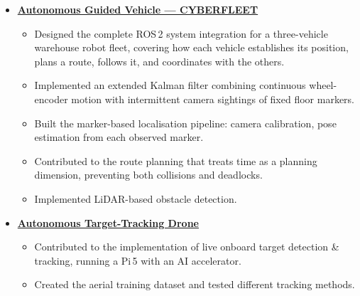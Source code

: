 \documentclass[10pt]{article}
\begin{document}
\begin{itemize}[label={}, leftmargin=0pt, itemsep=5pt]
    \item \textbf{\href{https://youtu.be/TkmOu6lCBTw?si=8KOdXk-vVMPzP4vm}{Autonomous Guided Vehicle ---
    CYBERFLEET}}
    \begin{itemize}
        \item Designed the complete ROS\,2 system integration for a three-vehicle
        warehouse robot fleet, covering how each vehicle establishes its position, plans a route,
        follows it, and coordinates with the others.
        \item Implemented an extended Kalman filter combining continuous wheel-encoder motion with
        intermittent camera sightings of fixed floor markers.
        \item Built the marker-based localisation pipeline: camera calibration, pose estimation
        from each observed marker.
        \item Contributed to the route planning that treats time as a planning dimension, preventing both collisions and deadlocks.
        \item Implemented LiDAR-based obstacle detection.
    \end{itemize}

    \item \textbf{\href{https://www.youtube.com/watch?v=MLrD0SuG4Q0}{Autonomous Target-Tracking
    Drone}}
    \begin{itemize}
        \item Contributed to the implementation of live onboard target detection \& tracking, running a Pi\,5 with an AI accelerator. 
        \item Created the aerial training
        dataset and tested different tracking methods.
    \end{itemize}




\end{itemize}
\end{document}
